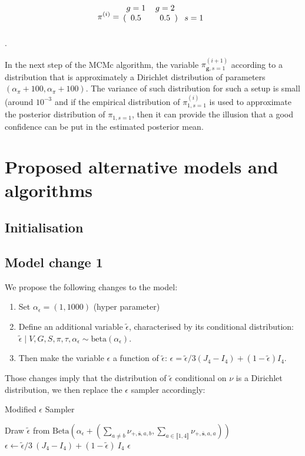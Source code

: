 \documentclass{article}
\newcommand\indexsum[1]{\mathbf{\bar{#1}}}
\newcommand\indexvec[1]{\mathbf{#1}}
\begin{document}
$$\pi^{(i)}=\begin{blockarray}{ccc}
    g=1&g=2&\\
    \begin{block}{(cc)c}
    0.5&0.5&s=1\\
    \end{block}
\end{blockarray}$$.
    
In the next step of the MCMc algorithm, the variable $\pi^{(i+1)}_{\indexvec{g},s=1}$ according to a distribution that is approximately a Dirichlet distribution of parameters $(\alpha_\pi+100,\alpha_\pi+100)$. 
The variance of such distribution for such a setup is small (around $10^{-3}$ and if the empirical distribution of $\pi^{(i)}_{1,s=1}$ is used to approximate the posterior distribution of $\pi_{1,s=1}$, then it can provide the illusion that a good confidence can be put in the estimated posterior mean.


\section{Proposed alternative models and algorithms}

\subsection{Initialisation }

\subsection{Model change 1 }
We propose the following changes to the model:
\begin{enumerate}
    \item Set $\alpha_\epsilon=(1,1000)$ (hyper parameter)
\item Define an additional variable $\tilde\epsilon$, characterised by its conditional distribution: $\tilde\epsilon\mid V,G,S,\pi,\tau,\alpha_\epsilon\sim \mathrm{beta}(\alpha_\epsilon)$.
\item Then make the variable $\epsilon$  a function of $\tilde\epsilon$: $\epsilon=\tilde\epsilon/3 (J_4-I_4)+(1-\tilde\epsilon) I_4$.
\end{enumerate}
Those changes imply that the distribution of $\tilde\epsilon$ conditional on $\nu$ is a Dirichlet distribution, we then replace the $\epsilon$ sampler accordingly:


\begin{algorithm}[H]
\caption{Modified $\epsilon$ Sampler }\label{alg:desman_tau}
\begin{algorithmic}
        \State Draw $\tilde\epsilon$
        from $\mathrm{Beta}\left(\alpha_\epsilon+
        \left(\sum_{a\neq b}\nu_{+,\indexsum{s},a,b},\sum_{a\in\llbracket 1,4\rrbracket}\nu_{+,\indexsum{s},a,a}\right)\right)$
        \State $\epsilon\gets \tilde\epsilon/3~ (J_4-I_4)+(1-\tilde\epsilon)~ I_4$
\State \Return $\epsilon$
\EndProcedure
\end{algorithmic}
\end{algorithm}
\end{document}
